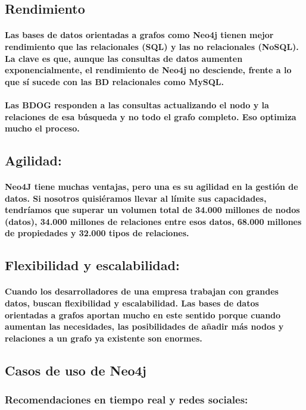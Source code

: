  \subsection{Rendimiento}
	 \paragraph{Las bases de datos orientadas a grafos como Neo4j tienen mejor rendimiento que las relacionales (SQL) y las no relacionales (NoSQL). La clave es que, aunque las consultas de datos aumenten exponencialmente, el rendimiento de Neo4j no desciende, frente a lo que sí sucede con las BD relacionales como MySQL.}
 	 \paragraph{Las BDOG responden a las consultas actualizando el nodo y la relaciones de esa búsqueda y no todo el grafo completo. Eso optimiza mucho el proceso.}
\subsection{ Agilidad:}
	 \paragraph{Neo4J tiene muchas ventajas, pero una es su agilidad en la gestión de datos. Si nosotros quisiéramos llevar al límite sus capacidades, tendríamos que superar un volumen total de 34.000 millones de nodos (datos), 34.000 millones de relaciones entre esos datos, 68.000 millones de propiedades y 32.000 tipos de relaciones. }
\subsection{Flexibilidad y escalabilidad:}
 	 \paragraph{Cuando los desarrolladores de una empresa trabajan con grandes datos, buscan flexibilidad y escalabilidad. Las bases de datos orientadas a grafos aportan mucho en este sentido porque cuando aumentan las necesidades, las posibilidades de añadir más nodos y relaciones a un grafo ya existente son enormes.}
\subsection{Casos de uso de Neo4j}
\subsubsection{Recomendaciones en tiempo real y redes sociales:}
